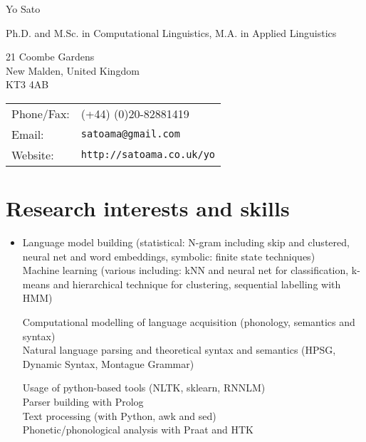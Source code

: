 \documentclass[a4paper]{article}
\def\name{Yo Sato}
\def\website{{\tt\small http://satoama.co.uk/yo}}
\begin{document}
{\huge \name}

\smallskip

Ph.D. and M.Sc. in Computational Linguistics, M.A. in Applied Linguistics\\


\vspace{0.25in}

\begin{minipage}{0.4\linewidth}

 21 Coombe Gardens\\
  New Malden, United Kingdom\\
KT3 4AB\\

\end{minipage}
\begin{minipage}{0.43\linewidth}
  \begin{tabular}{ll}
    Phone/Fax: & (+44) (0)20-82881419 \\
    Email: & {\tt satoama@gmail.com} \\
    Website: & \website{} 

  \end{tabular}
\end{minipage}

\personal

\section*{Research interests and skills}

\begin{itemize}
\item  Language model building (statistical: N-gram including skip and clustered, neural net and word embeddings, symbolic: finite state techniques)\\
  Machine learning (various including: kNN and neural net for classification, k-means and hierarchical technique for clustering, sequential labelling with HMM)

  Computational modelling of language acquisition
  (phonology, semantics and syntax)\\
  Natural language parsing and theoretical syntax and semantics (HPSG,
  Dynamic Syntax, Montague Grammar)

  Usage of python-based tools (NLTK, sklearn, RNNLM)\\
  Parser building with Prolog\\
  Text processing (with Python, awk and sed)\\
  Phonetic/phonological analysis with Praat and HTK

\end{itemize}
\end{document}
